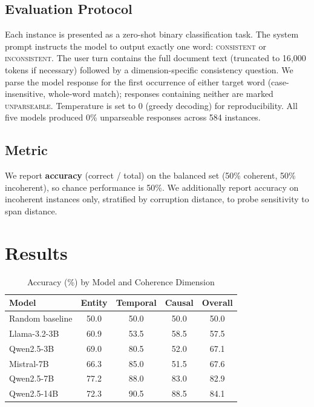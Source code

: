 \documentclass[conference]{IEEEtran}
\begin{document}
\subsection{Evaluation Protocol}
Each instance is presented as a zero-shot binary classification task.
The system prompt instructs the model to output exactly one word:
\textsc{consistent} or \textsc{inconsistent}.
The user turn contains the full document text (truncated to 16{,}000 tokens
if necessary) followed by a dimension-specific consistency question.
We parse the model response for the first occurrence of either target word
(case-insensitive, whole-word match);
responses containing neither are marked \textsc{unparseable}.
Temperature is set to 0 (greedy decoding) for reproducibility.
All five models produced 0\% unparseable responses across 584 instances.

\subsection{Metric}
We report \textbf{accuracy} (correct / total)
on the balanced set (50\% coherent, 50\% incoherent),
so chance performance is 50\%.
We additionally report accuracy on incoherent instances only,
stratified by corruption distance, to probe sensitivity to span distance.

\section{Results}

\begin{table}[t]
\centering
\caption{Accuracy (\%) by Model and Coherence Dimension}
\label{tab:main_results}
\begin{tabular}{lcccc}
\hline
\textbf{Model} & \textbf{Entity} & \textbf{Temporal} & \textbf{Causal} & \textbf{Overall} \\
\hline
Random baseline & 50.0 & 50.0 & 50.0 & 50.0 \\
\hline
Llama-3.2-3B & 60.9 & 53.5 & 58.5 & 57.5 \\
Qwen2.5-3B & 69.0 & 80.5 & 52.0 & 67.1 \\
Mistral-7B & 66.3 & 85.0 & 51.5 & 67.6 \\
Qwen2.5-7B & 77.2 & 88.0 & 83.0 & 82.9 \\
Qwen2.5-14B & 72.3 & 90.5 & 88.5 & 84.1 \\
\hline
\end{tabular}
\end{table}
\end{document}
